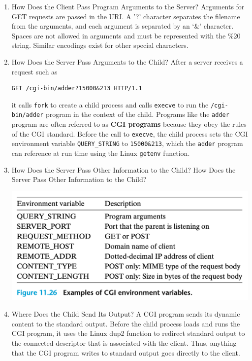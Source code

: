 \documentclass[11pt]{article}
\begin{document}
\begin{enumerate}
\item How Does the Client Pass Program Arguments to the Server?
\label{sec:org5673b38}
Arguments for GET requests are passed in the URI. A '?' character separates the filename from the arguments, and each argument is separated by an ‘\&’ character. Spaces are not allowed in arguments and must be represented with the \%20 string. Similar encodings exist for other special characters.\\


\item How Does the Server Pass Arguments to the Child?
\label{sec:org09c15c0}
After a server receives a request such as\\
\begin{verbatim}
GET /cgi-bin/adder?15000&213 HTTP/1.1
\end{verbatim}
it calls \texttt{fork} to create a child process and calls \texttt{execve} to run the \texttt{/cgi-bin/adder} program in the context of the child. Programs like the \texttt{adder} program are often referred to as \textbf{CGI programs} because they obey the rules of the CGI standard. Before the call to \texttt{execve}, the child process sets the CGI environment variable \texttt{QUERY\_STRING} to \texttt{15000\&213}, which the \texttt{adder} program can reference at run time using the Linux \texttt{getenv} function.\\

\item How Does the Server Pass Other Information to the Child?
\label{sec:org74f2ecf}
How Does the Server Pass Other Information to the Child?\\

\begin{center}
\includegraphics[width=.9\linewidth]{pics/figure11.26-examples-of-cgi-environment-variables.png}
\end{center}

\item Where Does the Child Send Its Output?
\label{sec:orge4a6d59}
A CGI program sends its dynamic content to the standard output. Before the child process loads and runs the CGI program, it uses the Linux dup2 function to redirect standard output to the connected descriptor that is associated with the client. Thus, anything that the CGI program writes to standard output goes directly to the client.\\


\end{enumerate}
\end{document}
